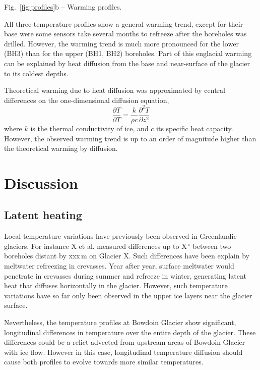 \documentclass[utf8]{article}
\begin{document}
    Fig.~\ref{fig:profiles}b -- Warming profiles.

    All three temperature profiles show a general warming trend, except for
    their base were some sensors take several months to refreeze after the
    boreholes was drilled.  However, the warming trend is much more pronounced
    for the lower (BH3) than for the upper (BH1, BH2) boreholes. Part of this
    englacial warming can be explained by heat diffusion from the base and
    near-surface of the glacier to its coldest depths.

    Theoretical warming due to heat diffusion was approximated by central
    differences on the one-dimensional diffusion equation,
    \begin{equation}
      \frac{\partial T}{\partial T} =
        \frac{k}{\rho c} \frac{\partial^2 T}{\partial z^2}
    \end{equation}
    where $k$ is the thermal conductivity of ice, and $c$ its specific heat
    capacity. However, the observed warming trend is up to an order of
    magnitude higher than the theoretical warming by diffusion.


\section{Discussion}

\subsection{Latent heating}

    Local temperature variations have previously been observed in Greenlandic
    glaciers.  For instance X et al. measured differences up to X\,$^\circ$
    between two boreholes distant by xxx\,m on Glacier X. Such differences have
    been explain by meltwater refreezing in crevasses. Year after year, surface
    meltwater would penetrate in crevasses during summer and refreeze in
    winter, generating latent heat that diffuses horizontally in the glacier.
    However, such temperature variations have so far only been observed in the
    upper ice layers near the glacier surface.

    Nevertheless, the temperature profiles at Bowdoin Glacier show significant,
    longitudinal differences in temperature over the entire depth of the
    glacier. These differences could be a relict advected from upstream areas
    of Bowdoin Glacier with ice flow. However in this case, longitudinal
    temperature diffusion should cause both profiles to evolve towards more
    similar temperatures.
\end{document}
